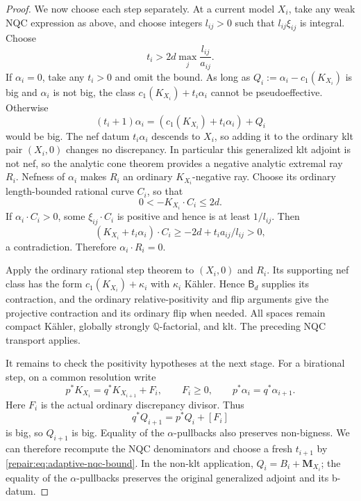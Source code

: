 \begin{proof}
We now choose each step separately. At a current model $X_i$, take
any weak NQC expression as above, and choose integers $l_{ij}>0$
such that $l_{ij}\xi_{ij}$ is integral. Choose
\begin{equation}\label{repair:eq:adaptive-nqc-bound}
                    t_i>2d\max_j\frac{l_{ij}}{a_{ij}}.
\end{equation}
If $\alpha_i=0$, take any $t_i>0$ and omit the bound.
As long as $Q_i:=\alpha_i-c_1(K_{X_i})$ is big and $\alpha_i$
is not big, the class $c_1(K_{X_i})+t_i\alpha_i$ cannot be
pseudoeffective. Otherwise
\[
 (t_i+1)\alpha_i
       =(c_1(K_{X_i})+t_i\alpha_i)+Q_i
\]
would be big. The nef datum $t_i\alpha_i$ descends to $X_i$, so
adding it to the ordinary klt pair $(X_i,0)$ changes no discrepancy.
In particular this generalized klt adjoint is not nef, so the
analytic cone theorem provides a negative analytic
extremal ray $R_i$. Nefness of $\alpha_i$ makes $R_i$ an ordinary
$K_{X_i}$-negative ray. Choose its ordinary length-bounded rational
curve $C_i$, so that
\[
                       0<-K_{X_i}\cdot C_i\leq2d.
\]
If $\alpha_i\cdot C_i>0$, some $\xi_{ij}\cdot C_i$ is positive
and hence is at least $1/l_{ij}$. Then
\[
 (K_{X_i}+t_i\alpha_i)\cdot C_i
       \geq-2d+t_i a_{ij}/l_{ij}>0,
\]
a contradiction. Therefore $\alpha_i\cdot R_i=0$.

Apply the ordinary rational step theorem to $(X_i,0)$ and $R_i$.
Its supporting nef class has the form $c_1(K_{X_i})+\kappa_i$
with $\kappa_i$ K\"ahler. Hence $\mathsf B_d$ supplies its
contraction, and the ordinary relative-positivity and flip arguments
give the projective contraction and its ordinary flip when needed.
All spaces remain compact K\"ahler, globally strongly
$\mathbb Q$-factorial, and klt. The preceding NQC transport applies.

It remains to check the positivity hypotheses at the next stage.
For a birational step, on a common resolution write
\[
 p^*K_{X_i}=q^*K_{X_{i+1}}+F_i,
 \qquad F_i\geq0,
 \qquad p^*\alpha_i=q^*\alpha_{i+1}.
\]
Here $F_i$ is the actual ordinary discrepancy divisor. Thus
\[
                 q^*Q_{i+1}=p^*Q_i+[F_i]
\]
is big, so $Q_{i+1}$ is big. Equality of the $\alpha$-pullbacks
also preserves non-bigness. We can therefore recompute the NQC
denominators and choose a fresh $t_{i+1}$ by
\eqref{repair:eq:adaptive-nqc-bound}. In the non-klt application,
$Q_i=B_i+\mathbf M_{X_i}$; the equality of the $\alpha$-pullbacks
preserves the original generalized adjoint and its b-datum.


\end{proof}
